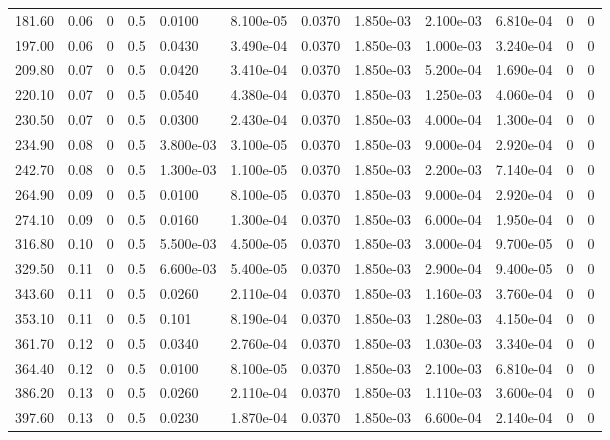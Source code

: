 \documentclass[preview]{standalone}
\begin{document}
{{\begin{tabular}{L{1.2cm}C{1.2cm} C{0.3cm}C{0.5cm} C{1.4cm}C{1.4cm} C{1.4cm}C{1.4cm} C{1.6cm}C{1.6cm} C{1.6cm}C{1.6cm}}
  181.60  &  0.06  & 0     & 0.5 &  0.0100  & 8.100e-05  &  0.0370&   1.850e-03& 2.100e-03 & 6.810e-04   &  0 & 0  \\ 
  197.00  &  0.06  & 0     & 0.5 &  0.0430  & 3.490e-04  &  0.0370&   1.850e-03& 1.000e-03 & 3.240e-04   &  0 & 0  \\ 
  209.80  &  0.07  & 0     & 0.5 &  0.0420  & 3.410e-04  &  0.0370&   1.850e-03& 5.200e-04 & 1.690e-04   &  0 & 0  \\ 
  220.10  &  0.07  & 0     & 0.5 &  0.0540  & 4.380e-04  &  0.0370&   1.850e-03& 1.250e-03 & 4.060e-04   &  0 & 0  \\ 
  230.50  &  0.07  & 0     & 0.5 &  0.0300  & 2.430e-04  &  0.0370&   1.850e-03& 4.000e-04 & 1.300e-04   &  0 & 0  \\ 
  234.90  &  0.08  & 0     & 0.5 &  3.800e-03  & 3.100e-05  &  0.0370&   1.850e-03& 9.000e-04 & 2.920e-04   &  0 & 0  \\ 
  242.70  &  0.08  & 0     & 0.5 &  1.300e-03  & 1.100e-05  &  0.0370&   1.850e-03& 2.200e-03 & 7.140e-04   &  0 & 0  \\ 
  264.90  &  0.09  & 0     & 0.5 &  0.0100  & 8.100e-05  &  0.0370&   1.850e-03& 9.000e-04 & 2.920e-04   &  0 & 0  \\ 
  274.10  &  0.09  & 0     & 0.5 &  0.0160  & 1.300e-04  &  0.0370&   1.850e-03& 6.000e-04 & 1.950e-04   &  0 & 0  \\ 
  316.80  &  0.10  & 0     & 0.5 &  5.500e-03  & 4.500e-05  &  0.0370&   1.850e-03& 3.000e-04 & 9.700e-05   &  0 & 0  \\ 
  329.50  &  0.11  & 0     & 0.5 &  6.600e-03  & 5.400e-05  &  0.0370&   1.850e-03& 2.900e-04 & 9.400e-05   &  0 & 0  \\ 
  343.60  &  0.11  & 0     & 0.5 &  0.0260  & 2.110e-04  &  0.0370&   1.850e-03& 1.160e-03 & 3.760e-04   &  0 & 0  \\ 
  353.10  &  0.11  & 0     & 0.5 &  0.101  & 8.190e-04  &  0.0370&   1.850e-03& 1.280e-03 & 4.150e-04   &  0 & 0  \\ 
  361.70  &  0.12  & 0     & 0.5 &  0.0340  & 2.760e-04  &  0.0370&   1.850e-03& 1.030e-03 & 3.340e-04   &  0 & 0  \\ 
  364.40  &  0.12  & 0     & 0.5 &  0.0100  & 8.100e-05  &  0.0370&   1.850e-03& 2.100e-03 & 6.810e-04   &  0 & 0  \\ 
  386.20  &  0.13  & 0     & 0.5 &  0.0260  & 2.110e-04  &  0.0370&   1.850e-03& 1.110e-03 & 3.600e-04   &  0 & 0  \\ 
  397.60  &  0.13  & 0     & 0.5 &  0.0230  & 1.870e-04  &  0.0370&   1.850e-03& 6.600e-04 & 2.140e-04   &  0 & 0  \\ 

\end{tabular}}}
\end{document}
